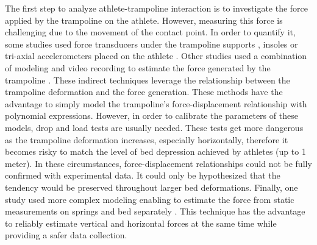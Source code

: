 The first step to analyze athlete-trampoline interaction is to investigate the force applied by the trampoline on the athlete.
However, measuring this force is challenging due to the movement of the contact point.
In order to quantify it, some studies used force transducers under the trampoline supports \cite{jacques2008determining, ando1987biomechanical, hennig1988loads}, insoles \cite{glitsch1992pressure} or tri-axial accelerometers placed on the athlete \cite{eager2012characterisation}.
Other studies used a combination of modeling and video recording to estimate the force generated by the trampoline \cite{vaughan1980kinetic, blajer2001modeling, zuo2016finite, burke2015mechanics}.
These indirect techniques leverage the relationship between the trampoline deformation and the force generation.
These methods have the advantage to simply model the trampoline's force-displacement relationship with polynomial expressions.
However, in order to calibrate the parameters of these models, drop and load tests are usually needed.
These tests get more dangerous as the trampoline deformation increases, especially horizontally, therefore it becomes risky to match the level of bed depression achieved by athletes (up to 1 meter).
In these circumstances, force-displacement relationships could not be fully confirmed with experimental data. 
It could only be hypothesized that the tendency would be preserved throughout larger bed deformations.
Finally, one study used more complex modeling enabling to estimate the force from static measurements on springs and bed separately \cite{jacques2008determining}.
This technique has the advantage to reliably estimate vertical and horizontal forces at the same time while providing a safer data collection.


